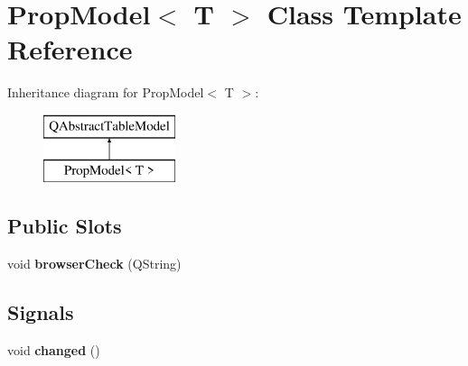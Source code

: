 \hypertarget{class_prop_model}{}\section{Prop\+Model$<$ T $>$ Class Template Reference}
\label{class_prop_model}
Inheritance diagram for Prop\+Model$<$ T $>$\+:\begin{figure}[H]
\begin{center}
\leavevmode
\includegraphics[height=2.000000cm]{class_prop_model}
\end{center}
\end{figure}
\subsection*{Public Slots}
\begin{DoxyCompactItemize}
\item 
\mbox{\label{class_prop_model_a801f9bc9ebfed212160c5943cc766cbf}} 
void {\bfseries browser\+Check} (Q\+String)
\end{DoxyCompactItemize}
\subsection*{Signals}
\begin{DoxyCompactItemize}
\item 
\mbox{\label{class_prop_model_a1785325d4209a2a99c3eb10a4e8c7ef5}} 
void {\bfseries changed} ()
\end{DoxyCompactItemize}
